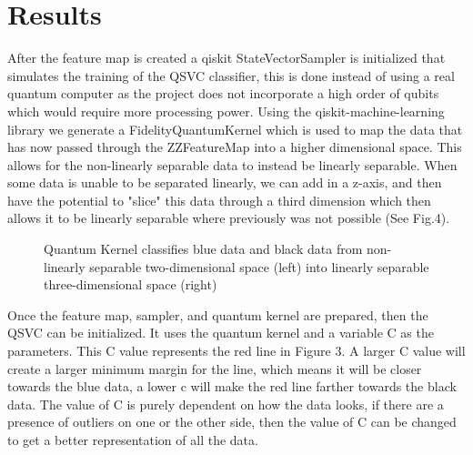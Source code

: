 \documentclass{article}
\begin{document}
\section*{Results}
After the feature map is created a qiskit StateVectorSampler is initialized that simulates the training of the QSVC classifier, this is done instead of using a real quantum computer as the project does not incorporate a high order of qubits which would require more processing power. Using the qiskit-machine-learning library we generate a FidelityQuantumKernel which is used to map the data that has now passed through the ZZFeatureMap into a higher dimensional space. This allows for the non-linearly separable data to instead be linearly separable. When some data is unable to be separated linearly, we can add in a z-axis, and then have the potential to "slice" this data through a third dimension which then allows it to be linearly separable where previously was not possible (See Fig.4). 
\begin{figure}[H]
    \centering
    \caption{Quantum Kernel classifies blue data and black data from non-linearly separable two-dimensional space (left) into linearly separable three-dimensional space (right)}
    \label{fig:4}
\end{figure}
\noindent
Once the feature map, sampler, and quantum kernel are prepared, then the QSVC can be initialized. It uses the quantum kernel and a variable C as the parameters. This C value represents the red line in Figure 3. A larger C value will create a larger minimum margin for the line, which means it will be closer towards the blue data, a lower c will make the red line farther towards the black data. The value of C is purely dependent on how the data looks, if there are a presence of outliers on one or the other side, then the value of C can be changed to get a better representation of all the data. 
\end{document}
